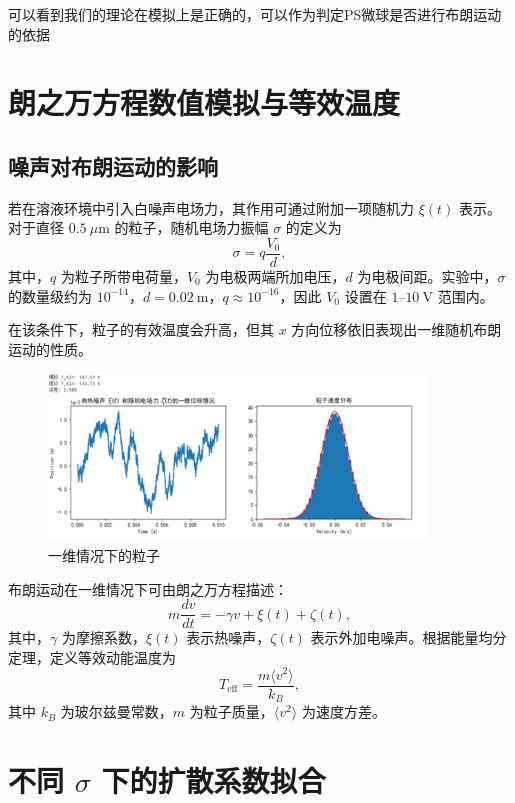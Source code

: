 \documentclass[a4paper]{report} %
\begin{document}
可以看到我们的理论在模拟上是正确的，可以作为判定PS微球是否进行布朗运动的依据

\section{朗之万方程数值模拟与等效温度}
\subsection{噪声对布朗运动的影响}

若在溶液环境中引入白噪声电场力，其作用可通过附加一项随机力 $\xi(t)$ 表示。对于直径 $0.5~\mu\text{m}$ 的粒子，随机电场力振幅 $\sigma$ 的定义为
\begin{equation}
  \sigma = q \frac{V_0}{d},
\end{equation}
其中，$q$ 为粒子所带电荷量，$V_0$ 为电极两端所加电压，$d$ 为电极间距。实验中，$\sigma$ 的数量级约为 $10^{-14}$，$d = 0.02~\text{m}$，$q \approx 10^{-16}$，因此 $V_0$ 设置在 $1$--$10~\text{V}$ 范围内。

在该条件下，粒子的有效温度会升高，但其 $x$ 方向位移依旧表现出一维随机布朗运动的性质。
\begin{figure}[H]
  \centering
  \includegraphics[width=0.9\textwidth]{一维位移.png}
  \caption{一维情况下的粒子}
  \label{fig:一维位移}
\end{figure}

布朗运动在一维情况下可由朗之万方程描述：
\begin{equation}
  m \frac{dv}{dt} = -\gamma v + \xi(t) + \zeta(t),
\end{equation}
其中，$\gamma$ 为摩擦系数，$\xi(t)$ 表示热噪声，$\zeta(t)$ 表示外加电噪声。根据能量均分定理，定义等效动能温度为
\begin{equation}
  T_{\text{eff}} = \frac{m \langle v^2 \rangle}{k_B},
\end{equation}
其中 $k_B$ 为玻尔兹曼常数，$m$ 为粒子质量，$\langle v^2 \rangle$ 为速度方差。

\section{不同 $\sigma$ 下的扩散系数拟合}
\end{document}
